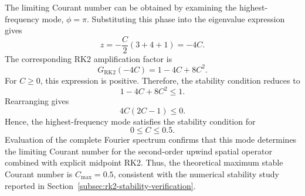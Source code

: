 The limiting Courant number can be obtained by examining the highest-frequency mode, $\phi=\pi$. Substituting this phase into the eigenvalue expression gives
\begin{equation}
    z=-\frac{C}{2}(3+4+1)=-4C.
    \label{eq:app-rk2-high-frequency-z}
\end{equation}
The corresponding RK2 amplification factor is
\begin{equation}
    G_{\mathrm{RK2}}(-4C)=1-4C+8C^2.
    \label{eq:app-rk2-high-frequency-g}
\end{equation}
For $C\geq 0$, this expression is positive. Therefore, the stability condition reduces to
\begin{equation}
    1-4C+8C^2\leq 1.
\end{equation}
Rearranging gives
\begin{equation}
    4C(2C-1)\leq 0.
\end{equation}
Hence, the highest-frequency mode satisfies the stability condition for
\begin{equation}
    \boxed{0\leq C\leq 0.5}.
    \label{eq:app-rk2-cfl-limit}
\end{equation}
Evaluation of the complete Fourier spectrum confirms that this mode determines the limiting Courant number for the second-order upwind spatial operator combined with explicit midpoint RK2. Thus, the theoretical maximum stable Courant number is $C_{\max}=0.5$, consistent with the numerical stability study reported in Section~\ref{subsec:rk2-stability-verification}.
